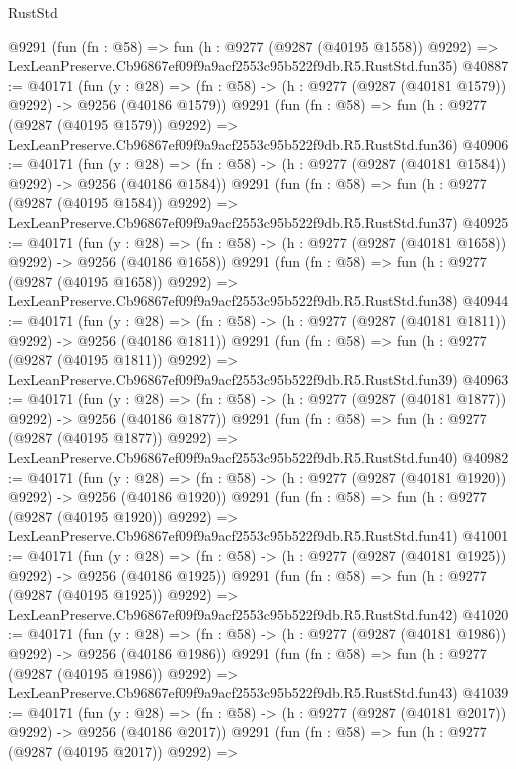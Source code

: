 \begin{lexlean}{RustStd}
\begin{coremodule}
    @9291
    (fun (fn : @58) =>
    fun (h : @9277 (@9287 (@40195 @1558)) @9292) =>
    LexLeanPreserve.Cb96867ef09f9a9acf2553c95b522f9db.R5.RustStd.fun35)
@40887 := @40171
    (fun (y : @28) =>
    (fn : @58) -> (h : @9277 (@9287 (@40181 @1579)) @9292) -> @9256 (@40186 @1579))
    @9291
    (fun (fn : @58) =>
    fun (h : @9277 (@9287 (@40195 @1579)) @9292) =>
    LexLeanPreserve.Cb96867ef09f9a9acf2553c95b522f9db.R5.RustStd.fun36)
@40906 := @40171
    (fun (y : @28) =>
    (fn : @58) -> (h : @9277 (@9287 (@40181 @1584)) @9292) -> @9256 (@40186 @1584))
    @9291
    (fun (fn : @58) =>
    fun (h : @9277 (@9287 (@40195 @1584)) @9292) =>
    LexLeanPreserve.Cb96867ef09f9a9acf2553c95b522f9db.R5.RustStd.fun37)
@40925 := @40171
    (fun (y : @28) =>
    (fn : @58) -> (h : @9277 (@9287 (@40181 @1658)) @9292) -> @9256 (@40186 @1658))
    @9291
    (fun (fn : @58) =>
    fun (h : @9277 (@9287 (@40195 @1658)) @9292) =>
    LexLeanPreserve.Cb96867ef09f9a9acf2553c95b522f9db.R5.RustStd.fun38)
@40944 := @40171
    (fun (y : @28) =>
    (fn : @58) -> (h : @9277 (@9287 (@40181 @1811)) @9292) -> @9256 (@40186 @1811))
    @9291
    (fun (fn : @58) =>
    fun (h : @9277 (@9287 (@40195 @1811)) @9292) =>
    LexLeanPreserve.Cb96867ef09f9a9acf2553c95b522f9db.R5.RustStd.fun39)
@40963 := @40171
    (fun (y : @28) =>
    (fn : @58) -> (h : @9277 (@9287 (@40181 @1877)) @9292) -> @9256 (@40186 @1877))
    @9291
    (fun (fn : @58) =>
    fun (h : @9277 (@9287 (@40195 @1877)) @9292) =>
    LexLeanPreserve.Cb96867ef09f9a9acf2553c95b522f9db.R5.RustStd.fun40)
@40982 := @40171
    (fun (y : @28) =>
    (fn : @58) -> (h : @9277 (@9287 (@40181 @1920)) @9292) -> @9256 (@40186 @1920))
    @9291
    (fun (fn : @58) =>
    fun (h : @9277 (@9287 (@40195 @1920)) @9292) =>
    LexLeanPreserve.Cb96867ef09f9a9acf2553c95b522f9db.R5.RustStd.fun41)
@41001 := @40171
    (fun (y : @28) =>
    (fn : @58) -> (h : @9277 (@9287 (@40181 @1925)) @9292) -> @9256 (@40186 @1925))
    @9291
    (fun (fn : @58) =>
    fun (h : @9277 (@9287 (@40195 @1925)) @9292) =>
    LexLeanPreserve.Cb96867ef09f9a9acf2553c95b522f9db.R5.RustStd.fun42)
@41020 := @40171
    (fun (y : @28) =>
    (fn : @58) -> (h : @9277 (@9287 (@40181 @1986)) @9292) -> @9256 (@40186 @1986))
    @9291
    (fun (fn : @58) =>
    fun (h : @9277 (@9287 (@40195 @1986)) @9292) =>
    LexLeanPreserve.Cb96867ef09f9a9acf2553c95b522f9db.R5.RustStd.fun43)
@41039 := @40171
    (fun (y : @28) =>
    (fn : @58) -> (h : @9277 (@9287 (@40181 @2017)) @9292) -> @9256 (@40186 @2017))
    @9291
    (fun (fn : @58) =>
    fun (h : @9277 (@9287 (@40195 @2017)) @9292) =>

\end{coremodule}
\end{lexlean}
